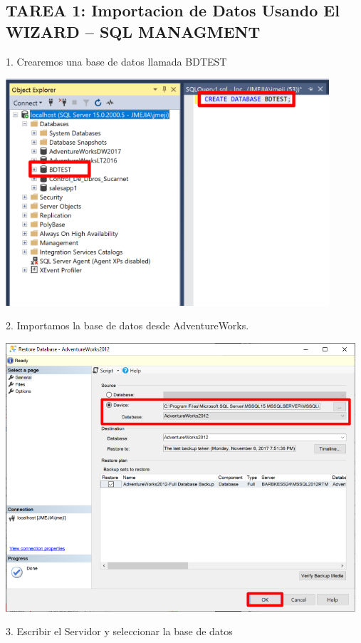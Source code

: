 \documentclass[12pt,letterpaper]{article}
\begin{document}
\subsection{TAREA 1: Importacion de Datos Usando El WIZARD – SQL MANAGMENT}
1. Crearemos una base de datos llamada BDTEST
	\begin{center}
	\includegraphics[width=12cm]{./img/1}
	\vspace{2cm}
	\end{center}	
2.  Importamos la  base de datos desde AdventureWorks.
	\begin{center}
	\includegraphics[width=13cm]{./img/2}
	\end{center}	
3. Escribir el Servidor y seleccionar la base de datos
\end{document}
